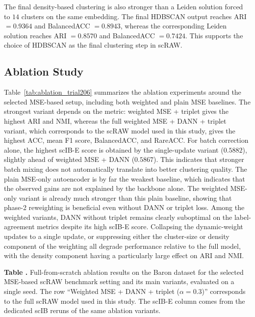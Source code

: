 \documentclass[11pt,a4paper]{article}
\begin{document}
The final density-based clustering is also stronger than a Leiden solution forced to $14$ clusters on the same embedding. The final HDBSCAN output reaches ARI $=0.9364$ and BalancedACC $=0.8943$, whereas the corresponding Leiden solution reaches ARI $=0.8570$ and BalancedACC $=0.7424$. This supports the choice of HDBSCAN as the final clustering step in scRAW.

\subsection{Ablation Study}

Table~\ref{tab:ablation_trial206} summarizes the ablation experiments around the selected MSE-based setup, including both weighted and plain MSE baselines. The strongest variant depends on the metric: weighted MSE + triplet gives the highest ARI and NMI, whereas the full weighted MSE + DANN + triplet variant, which corresponds to the scRAW model used in this study, gives the highest ACC, mean F1 score, BalancedACC, and RareACC. For batch correction alone, the highest scIB-E score is obtained by the single-update variant ($0.5882$), slightly ahead of weighted MSE + DANN ($0.5867$). This indicates that stronger batch mixing does not automatically translate into better clustering quality. The plain MSE-only autoencoder is by far the weakest baseline, which indicates that the observed gains are not explained by the backbone alone. The weighted MSE-only variant is already much stronger than this plain baseline, showing that phase-2 reweighting is beneficial even without DANN or triplet loss. Among the weighted variants, DANN without triplet remains clearly suboptimal on the label-agreement metrics despite its high scIB-E score. Collapsing the dynamic-weight updates to a single update, or suppressing either the cluster-size or density component of the weighting all degrade performance relative to the full model, with the density component having a particularly large effect on ARI and NMI.

\vspace{\baselineskip}
\noindent\textbf{Table \thetable.}
Full-from-scratch ablation results on the Baron dataset for the selected MSE-based scRAW benchmark setting and its main variants, evaluated on a single seed. The row ``Weighted MSE + DANN + triplet ($\alpha=0.3$)'' corresponds to the full scRAW model used in this study. The scIB-E column comes from the dedicated scIB reruns of the same ablation variants. 
\label{tab:ablation_trial206}
\end{document}
